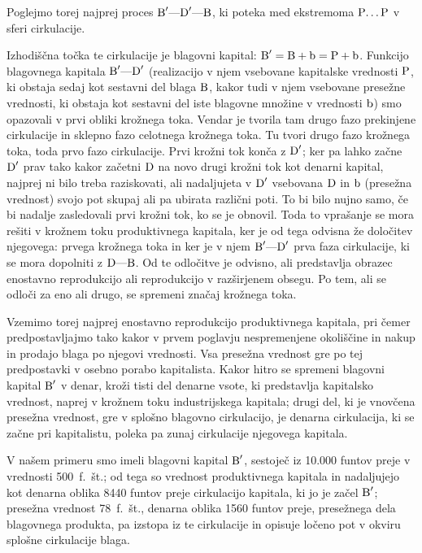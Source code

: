 \documentclass[kapital_02.tex]{subfiles}
\begin{document}
Poglejmo torej najprej proces \( \textrm{B}'\textrm{---}\textrm{D}'\textrm{---}\textrm{B} \), ki poteka med ekstremoma \( \textrm{P}\textrm{\dots}\textrm{P} \) v sferi cirkulacije.

Izhodiščna točka te cirkulacije je blagovni kapital: \( \textrm{B}' = \textrm{B} + \textrm{b} = \textrm{P} + \textrm{b} \). Funkcijo blagovnega kapitala \( \textrm{B}'\textrm{---}\textrm{D}' \) (realizacijo v njem vsebovane kapitalske vrednosti \( \textrm{P} \), ki obstaja sedaj kot sestavni del blaga \( \textrm{B} \), kakor tudi v njem vsebovane presežne vrednosti, ki obstaja kot sestavni del iste blagovne množine v vrednosti \( \textrm{b} \)) smo opazovali v prvi obliki krožnega toka. Vendar je tvorila tam drugo fazo prekinjene cirkulacije in sklepno fazo celotnega krožnega toka. Tu tvori drugo fazo krožnega toka, toda prvo fazo cirkulacije. Prvi krožni tok konča z \( \textrm{D}' \); ker pa lahko začne \( \textrm{D}' \) prav tako kakor začetni \( \textrm{D} \) na novo drugi krožni tok kot denarni kapital, najprej ni bilo treba raziskovati, ali nadaljujeta v \( \textrm{D}' \) vsebovana \( \textrm{D} \) in \( \textrm{b} \) (presežna vrednost) svojo pot skupaj ali pa ubirata različni poti. To bi bilo nujno samo, če bi nadalje zasledovali prvi krožni tok, ko se je obnovil. Toda to vprašanje se mora rešiti v krožnem toku produktivnega kapitala, ker je od tega odvisna že določitev njegovega: prvega krožnega toka in ker je v njem \( \textrm{B}'\textrm{---}\textrm{D}' \) prva faza cirkulacije, ki se mora dopolniti z \( \textrm{D}\textrm{---}\textrm{B} \). Od te odločitve je odvisno, ali predstavlja obrazec enostavno reprodukcijo ali reprodukcijo v razširjenem obsegu. Po tem, ali se odloči za eno ali drugo, se spremeni značaj krožnega toka.

Vzemimo torej najprej enostavno reprodukcijo produktivnega kapitala, pri čemer predpostavljajmo tako kakor v prvem poglavju nespremenjene okoliščine in nakup in prodajo blaga po njegovi vrednosti. Vsa presežna vrednost gre po tej predpostavki v osebno porabo kapitalista. Kakor hitro se spremeni blagovni kapital \( \textrm{B}' \) v denar, kroži tisti del denarne vsote, ki predstavlja kapitalsko vrednost, naprej v krožnem toku industrijskega kapitala; drugi del, ki je vnovčena presežna vrednost, gre v splošno blagovno cirkulacijo, je denarna cirkulacija, ki se začne pri kapitalistu, poleka pa zunaj cirkulacije njegovega kapitala.

V našem primeru smo imeli blagovni kapital \( \textrm{B}' \), sestoječ iz 10.000 funtov preje v vrednosti 500~f.~št.; od tega so vrednost produktivnega kapitala in nadaljujejo kot denarna oblika 8440 funtov preje cirkulacijo kapitala, ki jo je začel \( \textrm{B}' \); presežna vrednost 78~f.~št., denarna oblika 1560 funtov preje, presežnega dela blagovnega produkta, pa izstopa iz te cirkulacije in opisuje ločeno pot v okviru splošne cirkulacije blaga.
\end{document}
